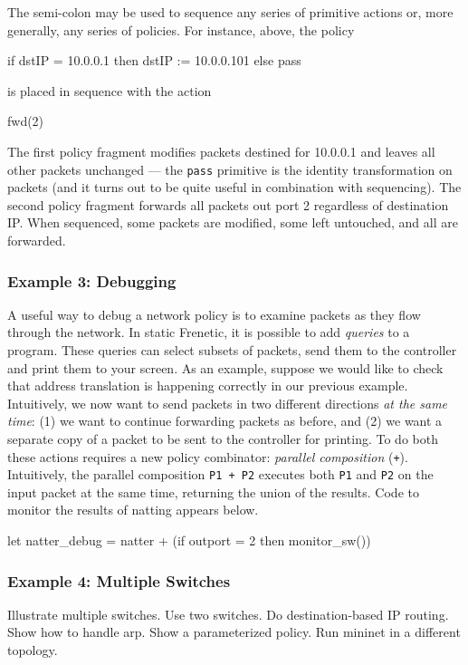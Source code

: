 \documentclass{article}
\newcommand{\code}[1]{\texttt{#1}}
\begin{document}
The semi-colon may be used to sequence any series of primitive actions
or, more generally, any series of policies.  For instance, above, the policy
%
\begin{progeg}
if dstIP = 10.0.0.1 then dstIP := 10.0.0.101 else pass
\end{progeg}
%
is placed in sequence with the action
%
\begin{progeg}
fwd(2)
\end{progeg}
%
The first policy fragment modifies packets destined for 10.0.0.1 and leaves
all other packets unchanged --- the \code{pass} primitive is the identity
transformation on packets (and it turns out to be quite useful in
combination with sequencing). The second policy fragment 
forwards all packets out port 2 regardless
of destination IP.  When sequenced, some packets are modified, some left
untouched, and all are forwarded.

\subsubsection{Example 3: Debugging}

A useful way to debug a network policy is to examine packets as they
flow through the network.  In static Frenetic, it is possible to add 
\emph{queries} to a program.  These queries can select subsets of packets,
send them to the controller and print them to your screen.  As
an example, suppose we would like to check that address translation 
is happening correctly in our previous example.  Intuitively, we now
want to send packets in two different directions \emph{at the same time}:
(1) we want to continue forwarding packets as before, and (2) we want
a separate copy of a packet to be sent to the controller for printing.
To do both these actions requires a new policy combinator: 
\emph{parallel composition} (\code{+}).  Intuitively, the parallel
composition \code{P1 + P2} executes both \code{P1} and \code{P2}
on the input packet at the same time, returning the union of the results.
Code to monitor the results of natting appears below.
%
\begin{progeg}
let natter\_debug = 
  natter + (if outport = 2 then monitor\_sw())
\end{progeg}
%


\subsubsection{Example 4: Multiple Switches}
Illustrate multiple switches.  Use two switches.  Do destination-based
IP routing.  Show how to handle arp.  Show a parameterized policy.
Run mininet in a different topology.
\end{document}
